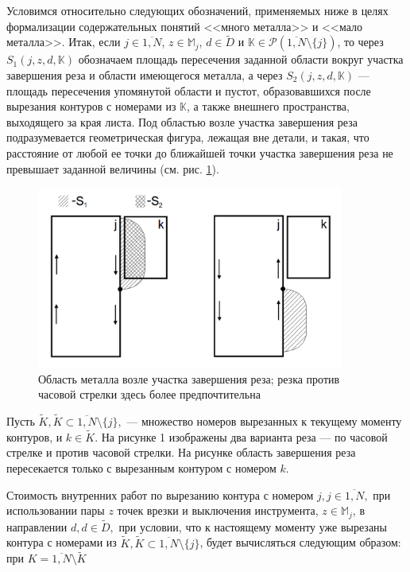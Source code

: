 \documentclass[11pt,twoside,openany]{report}
\begin{document}
{{Условимся относительно следующих обозначений, применяемых ниже в целях формализации
содержательных понятий <<много металла>> и <<мало металла>>. Итак, если
$j\in \overline{1,N}$, $z\in \mathbb{M}_j$, $d\in \tilde{D}$ и
$\mathbb{K}\in \mathcal{P}(\overline{1,N}\setminus \{j\})$, то через
$S_1(j,z,d,\mathbb{K})$ обозначаем площадь пересечения заданной
области вокруг участка завершения реза и области имеющегося металла, а через
$S_2(j,z,d,\mathbb{K})$ --- площадь пересечения упомянутой области
и пустот, образовавшихся после вырезания контуров с номерами из $\mathbb{K}$,
а также внешнего пространства, выходящего за края листа. Под областью возле
участка завершения реза подразумевается геометрическая фигура, лежащая вне
детали, и такая, что расстояние от любой ее точки до ближайшей точки участка
завершения реза не превышает заданной величины (см. рис. \ref{FinishCutArea}).

\begin{figure}
  \begin{center}
  \includegraphics[width=0.9\textwidth]{CutFinishArea.png}
  \caption{Область металла возле участка завершения реза; резка против часовой
стрелки здесь более предпочтительна}
  \label{FinishCutArea}
  \end{center}
\end{figure}

Пусть $\tilde{K}, \tilde{K}\subset \overline{1,N}\setminus \{j\},$
--- множество номеров вырезанных к текущему моменту контуров,
и $k\in \tilde{K}$. На рисунке 1 изображены
два варианта реза --- по часовой стрелке и против часовой стрелки.
На рисунке область завершения реза пересекается только с вырезанным
контуром с номером $k$.

Стоимость внутренних работ по вырезанию контура с номером $j,j\in \overline{1,N},$
при использовании пары $z$ точек врезки и выключения инструмента,
$z\in \mathbb{M}_j$, в направлении $d,d\in \tilde{D},$ при условии,
что к настоящему моменту уже вырезаны контура с номерами из
$\tilde{K},\tilde{K}\subset \overline{1,N}\setminus \{j\}$, будет
вычисляться следующим образом: при $K=\overline{1,N}\setminus \tilde{K}$

}}
\end{document}
